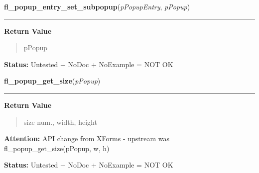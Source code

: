     \label{xformslib:library:fl_popup_entry_set_subpopup}

    \vspace{0.5ex}

\hspace{.8\funcindent}\begin{boxedminipage}{\funcwidth}

    \raggedright \textbf{fl\_popup\_entry\_set\_subpopup}(\textit{pPopupEntry}, \textit{pPopup})

    \vspace{-1.5ex}

    \rule{\textwidth}{0.5\fboxrule}
\setlength{\parskip}{2ex}
\setlength{\parskip}{1ex}
      \textbf{Return Value}
    \vspace{-1ex}

      \begin{quote}
      pPopup

      \end{quote}

\textbf{Status:} Untested + NoDoc + NoExample = NOT OK



    \end{boxedminipage}

    \label{xformslib:library:fl_popup_get_size}

    \vspace{0.5ex}

\hspace{.8\funcindent}\begin{boxedminipage}{\funcwidth}

    \raggedright \textbf{fl\_popup\_get\_size}(\textit{pPopup})

    \vspace{-1.5ex}

    \rule{\textwidth}{0.5\fboxrule}
\setlength{\parskip}{2ex}
\setlength{\parskip}{1ex}
      \textbf{Return Value}
    \vspace{-1ex}

      \begin{quote}
      size num., width, height

      \end{quote}

\textbf{Attention:} API change from XForms - upstream was fl\_popup\_get\_size(pPopup, w, h)



\textbf{Status:} Untested + NoDoc + NoExample = NOT OK



    \end{boxedminipage}

